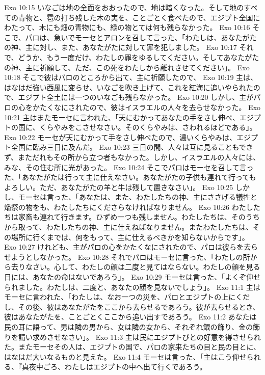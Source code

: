 Exo 10:15  いなごは地の全面をおおったので、地は暗くなった。そして地のすべての青物と、雹の打ち残した木の実を、ことごとく食べたので、エジプト全国にわたって、木にも畑の青物にも、緑の物とては何も残らなかった。
Exo 10:16  そこで、パロは、急いでモーセとアロンを召して言った、「わたしは、あなたがたの神、主に対し、また、あなたがたに対して罪を犯しました。
Exo 10:17  それで、どうか、もう一度だけ、わたしの罪をゆるしてください。そしてあなたがたの神、主に祈願して、ただ、この死をわたしから離れさせてください」。
Exo 10:18  そこで彼はパロのところから出て、主に祈願したので、
Exo 10:19  主は、はなはだ強い西風に変らせ、いなごを吹き上げて、これを紅海に追いやられたので、エジプト全土には一つのいなごも残らなかった。
Exo 10:20  しかし、主がパロの心をかたくなにされたので、彼はイスラエルの人々を去らせなかった。
Exo 10:21  主はまたモーセに言われた、「天にむかってあなたの手をさし伸べ、エジプトの国に、くらやみをこさせなさい。そのくらやみは、さわれるほどである」。
Exo 10:22  モーセが天にむかって手をさし伸べたので、濃いくらやみは、エジプト全国に臨み三日に及んだ。
Exo 10:23  三日の間、人々は互に見ることもできず、まただれもその所から立つ者もなかった。しかし、イスラエルの人々には、みな、その住む所に光があった。
Exo 10:24  そこでパロはモーセを召して言った、「あなたがたは行って主に仕えなさい。あなたがたの子供も連れて行ってもよろしい。ただ、あなたがたの羊と牛は残して置きなさい」。
Exo 10:25  しかし、モーセは言った、「あなたは、また、わたしたちの神、主にささげる犠牲と燔祭の物をも、わたしたちにくださらなければなりません。
Exo 10:26  わたしたちは家畜も連れて行きます。ひずめ一つも残しません。わたしたちは、そのうちから取って、わたしたちの神、主に仕えねばなりません。またわたしたちは、その場所に行くまでは、何をもって、主に仕えるべきかを知らないからです」。
Exo 10:27  けれども、主がパロの心をかたくなにされたので、パロは彼らを去らせようとしなかった。
Exo 10:28  それでパロはモーセに言った、「わたしの所から去りなさい。心して、わたしの顔は二度と見てはならない。わたしの顔を見る日には、あなたの命はないであろう」。
Exo 10:29  モーセは言った、「よくぞ仰せられました。わたしは、二度と、あなたの顔を見ないでしょう」。
Exo 11:1  主はモーセに言われた、「わたしは、なお一つの災を、パロとエジプトの上にくだし、その後、彼はあなたがたをここから去らせるであろう。彼が去らせるとき、彼はあなたがたを、ことごとくここから追い出すであろう。
Exo 11:2  あなたは民の耳に語って、男は隣の男から、女は隣の女から、それぞれ銀の飾り、金の飾りを請い求めさせなさい」。
Exo 11:3  主は民にエジプトびとの好意を得させられた。またモーセその人は、エジプトの国で、パロの家来たちの目と民の目とに、はなはだ大いなるものと見えた。
Exo 11:4  モーセは言った、「主はこう仰せられる、『真夜中ごろ、わたしはエジプトの中へ出て行くであろう。
